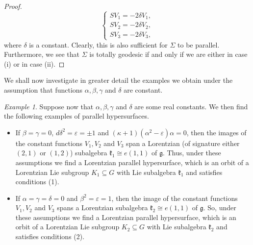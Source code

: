 \documentclass{amsart}
\theoremstyle{plain}
\theoremstyle{remark}
\newtheorem{example}{Example}
\newcommand\g{{\mathfrak{g}}}
\begin{document}
{\begin{proof}
\[
\left\{
\begin{array}{l}
SV_1 =  -2\delta V_1, \\[2 pt]
SV_2 =  -2\delta V_2, \\[2 pt]
SV_3 =  -2\delta V_3,
\end{array}
\right.
\]
where $\delta$ is a constant. Clearly, this is also sufficient for $\Sigma$ to be parallel. Furthermore, we see that $\Sigma$ is totally geodesic if and only if we are either in case (i) or in case (ii).
\end{proof}

We shall now investigate in greater detail the examples we obtain under the assumption that functions  $\alpha,\beta,\gamma$ and $\delta$ are constant.

\begin{example}
	Suppose now that $\alpha,\beta,\gamma$ and $\delta$ are some real constants. We then  find the following examples of parallel hypersurfaces.
	\begin{itemize}
		\item If $\beta =\gamma = 0$, $d\delta^2=\varepsilon =\pm 1$ and $(\kappa+1)(\alpha^2-\varepsilon)\alpha=0$, then the images of the constant functions $V_1,V_2$ and $V_3$ span a Lorentzian (of signature either $(2,1)$ or $(1,2)$) subalgebra $\mathfrak{k}_1 \cong e(1,1)$ of $\g$. Thus, under these assumptions we find a  Lorentzian parallel hypersurface, which is an orbit of a Lorentzian Lie subgroup $K_1\subseteq G$ with Lie subalgebra $\mathfrak{k}_1$ and  satisfies conditions (1).
		\item If $\alpha=\gamma=\delta=0$ and $\beta^2=\varepsilon=1$, then the image of the constant functions $V_1,V_2$ and $V_3$ spans a Lorentzian subalgebra $\mathfrak{k}_2 \cong e(1,1)$ of $\g$. So, under these assumptions we find a Lorentzian parallel hypersurface, which is an orbit of a Lorentzian Lie subgroup $K_2\subseteq G$ with Lie subalgebra $\mathfrak{k}_2$ and satisfies conditions (2).
	\end{itemize}
\end{example}

}
\end{document}
